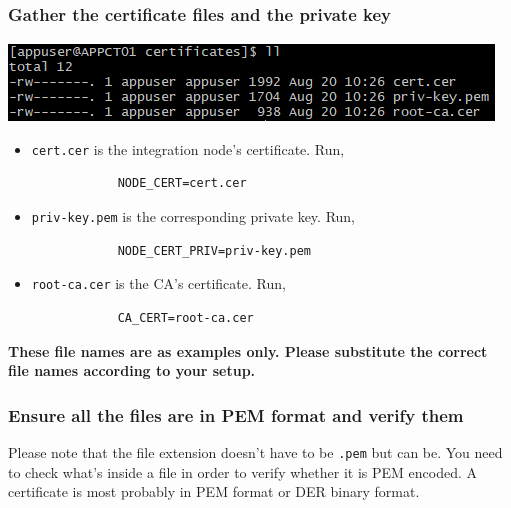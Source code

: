 \documentclass{article}
\begin{document}
    \subsubsection{Gather the certificate files and the private key}
    \includegraphics[width=\textwidth,height=\textheight,keepaspectratio]{cert-ls.png}
    \begin{itemize}
        \item \texttt{cert.cer} is the integration node's certificate. Run,
        \begin{lstlisting}
            NODE_CERT=cert.cer
        \end{lstlisting}
        \item \texttt{priv-key.pem} is the corresponding private key. Run,
        \begin{lstlisting}
            NODE_CERT_PRIV=priv-key.pem
        \end{lstlisting}
        \item \texttt{root-ca.cer} is the CA's certificate. Run,
        \begin{lstlisting}
            CA_CERT=root-ca.cer
        \end{lstlisting}
    \end{itemize}
    \textbf{These file names are as examples only. Please substitute the correct file names according to your setup.}

    \subsubsection{Ensure all the files are in PEM format and verify them}
    Please note that the file extension doesn't have to be \texttt{.pem} but can be. You need to check what's inside a file in order to verify whether it is PEM encoded. A certificate is most probably in PEM format or DER binary format.
\end{document}
